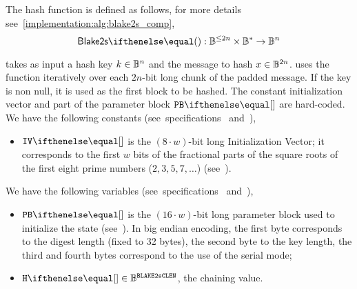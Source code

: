 The hash function is defined as follows, for more details see~\cref{implementation:alg:blake2s_comp},
\[
  \blake{2s}{} : \BB^{\leq 2n} \times \BB^{*} \to \BB^n
\]

 takes as input a hash key $k \in \mathbb{B}^n$ and the message to hash $x \in \mathbb{B}^{2n}$.
%
 uses the  function iteratively over each $2n$-bit long chunk of the padded message. If the key is non null, it is used as the first block to be hashed. The constant initialization vector \blakeIV{} and part of the parameter block $\blakePB{}$ are hard-coded. We have the following constants (see~specifications~\cite{aumasson2013blake2} and~\cite[Section 2.2]{blakecompietf}),
\begin{itemize}
    \item $\blakeIV{}$ is the $(8 \cdot w)$-bit long Initialization Vector; it corresponds to the first $w$ bits of the fractional parts of the square roots of the first eight prime numbers ($2, 3, 5, 7, \ldots$) (see~\cite[Section 2.6]{blakecompietf}).
\end{itemize}
  We have the following variables (see~specifications~\cite{aumasson2013blake2} and~\cite[Section 2.2]{blakecompietf}),
  \begin{itemize}
    \item $\blakePB{}$ is the $(16 \cdot w)$-bit long parameter block used to initialize the state (see~\cite[Section 2.5]{blakecompietf}). In big endian encoding, the first byte corresponds to the digest length (fixed to 32 bytes), the second byte to the key length, the third and fourth bytes correspond to the use of the serial mode;
    \item $\blakeInitState{} \in \BB^\blakeCompLen$, the chaining value.
\end{itemize}

